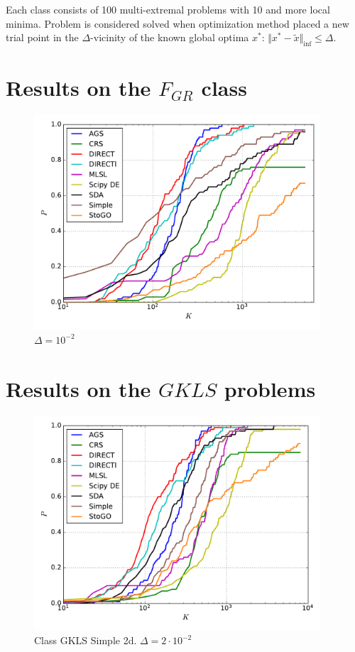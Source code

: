 \documentclass[a4paper]{article}
\begin{document}
Each class consists of 100 multi-extremal problems with 10 and more local minima. Problem is considered solved when optimization method placed a new trial point in the $\Delta$-vicinity of the known global optima $x^*$: $\Vert x^* - \widetilde{x} \Vert_{\inf} \le \Delta$.


\section{Results on the $F_{GR}$ class}

\begin{figure}[H]
  \center
  \includegraphics[width=0.95\textwidth]{../experiments/grish/cmc.pdf}
  \caption{$\Delta=10^{-2}$}
\end{figure}


\section{Results on the $GKLS$ problems}

\begin{figure}[H]
  \center
  \includegraphics[width=0.95\textwidth]{../experiments/gklss2d/cmc.pdf}
  \caption{Class GKLS Simple 2d. $\Delta=2\cdot10^{-2}$}
\end{figure}
\end{document}
